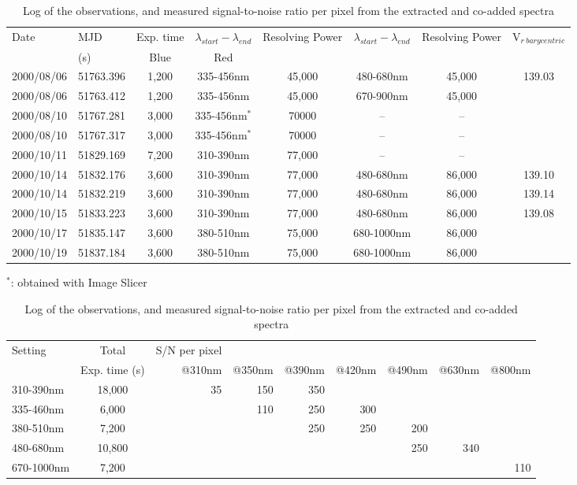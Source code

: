 \documentclass{aa}
\begin{document}
\begin{table}[htbp]
\caption{Log of the observations, and measured signal-to-noise ratio per
pixel from the extracted and co-added spectra}\label{T-log}
\begin{tabular}{llcccccc}
\hline
Date & MJD & Exp. time & $\lambda_{start} - \lambda_{end}$ & Resolving Power &
$\lambda_{start} -  \lambda_{end}$ &  Resolving Power &  V$_{r\: barycentric}$\\
& (s) & \multispan2 \hfill Blue \hfill & \multispan2 \hfill
Red \hfill & \\
2000/08/06 & 51763.396 & 1,200 & 335-456nm & 45,000 & 480-680nm & 45,000  & 139.03\\ 
2000/08/06 & 51763.412 & 1,200 & 335-456nm & 45,000 & 670-900nm & 45,000  &\\ 
2000/08/10 & 51767.281 & 3,000 & 335-456nm$^{*}$ & 70000 & --        & --  &\\ 
2000/08/10 & 51767.317 & 3,000 & 335-456nm$^{*}$ & 70000 & --        & --  &\\ 
2000/10/11 & 51829.169 & 7,200 & 310-390nm & 77,000 & --        & --  &\\
2000/10/14 & 51832.176 & 3,600 & 310-390nm & 77,000 & 480-680nm & 86,000  & 139.10\\ 
2000/10/14 & 51832.219 & 3,600 & 310-390nm & 77,000 & 480-680nm & 86,000  & 139.14\\ 
2000/10/15 & 51833.223 & 3,600 & 310-390nm & 77,000 & 480-680nm & 86,000  & 139.08\\ 
2000/10/17 & 51835.147 & 3,600 & 380-510nm & 75,000 & 680-1000nm & 86,000 & \\ 
2000/10/19 & 51837.184 & 3,600 & 380-510nm & 75,000 & 680-1000nm & 86,000 &\\ 
\end{tabular}

$^{*}$: obtained with Image Slicer

\begin{tabular}{lcrrrrrrr}
\hline
 Setting& Total &\multispan7 \hfill S/N per pixel \hfill\\
     & Exp. time (s)     &@310nm & @350nm& @390nm& @420nm& @490nm& @630nm & 
     @800nm\\
 310-390nm  &18,000 &35 &150 &350 \\
 335-460nm  & 6,000 &   &110 &250 &300\\
 380-510nm  & 7,200 &   &    &250 &250 &200\\
 480-680nm  &10,800 &   &    &    &   &250 & 340\\
 670-1000nm & 7,200 &   &    &    &   &    &     & 110 \\
\hline \hline
\end{tabular}
\end{table}
\end{document}
